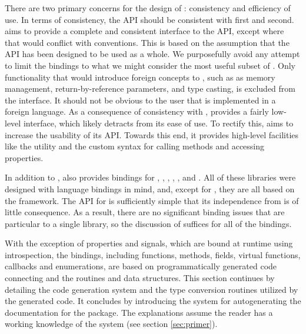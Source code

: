 \documentclass[article,shortnames]{jss}
\begin{document}
There are two primary concerns for the design of :
consistency
and efficiency of use. In terms of consistency, the API should be
consistent 
with  first and  second.  aims to
provide a 
complete and consistent interface to the  API, except where
that would
conflict with  conventions. This is based on the
assumption that the
 API has been designed to be used as a whole. We
purposefully avoid 
any attempt to limit the bindings to what we might consider the most
useful 
subset of . Only functionality that would introduce foreign
concepts
to , such as as memory management, return-by-reference
parameters, 
and type casting, is excluded from the  interface. It
should not be
obvious to the user that  is implemented in a foreign
language.
As a consequence of consistency with ,  provides
a fairly 
low-level interface, which likely detracts from its ease of use. To
rectify
this,  aims to increase the usability of its API. 
Towards this end, it provides high-level facilities like the
 utility and the custom syntax for calling methods
and accessing properties. 

In addition to ,  also provides bindings for
, , , , , and
.  All of these libraries were designed with language
bindings in mind, and, except for , they are all based on
the  framework.  The API for  is sufficiently
simple that its independence from  is of little
consequence. As a result, there are no significant binding issues that
are particular to a single library, so the discussion of 
suffices for all of the bindings.

With the exception of properties and signals, which are bound at
runtime using introspection, the  bindings, including
functions, methods, fields, virtual functions, callbacks and
enumerations, are based on programmatically generated code connecting
 and the  routines and data structures.  This
section continues by
detailing the code
generation system and the type conversion routines utilized by the
generated code. It concludes by introducing the system for
autogenerating the  documentation for the package. The
explanations assume the reader has a working knowledge of
the  system (see section \ref{sec:primer}).
\end{document}
